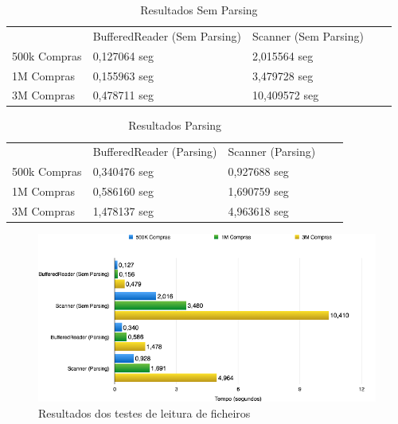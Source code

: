 \documentclass[10pt] {article}
\begin{document}
\begin{table}[h]
\centering
\caption{Resultados Sem Parsing}
\label{my-label}
\begin{tabular}{l|l|l|ll}
\cline{2-3}
                                   & BufferedReader (Sem Parsing) & Scanner (Sem Parsing) &  &  \\ \cline{1-3}
\multicolumn{1}{|l|}{500k Compras} & 0,127064 seg                 & 2,015564 seg          &  &  \\ \cline{1-3}
\multicolumn{1}{|l|}{1M Compras}   & 0,155963 seg                 & 3,479728 seg          &  &  \\ \cline{1-3}
\multicolumn{1}{|l|}{3M Compras}   & 0,478711 seg                 & 10,409572 seg         &  &  \\ \cline{1-3}
\end{tabular}
\end{table}

\begin{table}[h]
\centering
\caption{Resultados Parsing}
\label{my-label}
\begin{tabular}{l|l|l|ll}
\cline{2-3}
                                   & BufferedReader (Parsing) & Scanner (Parsing) &  &  \\ \cline{1-3}
\multicolumn{1}{|l|}{500k Compras} & 0,340476 seg             & 0,927688 seg      &  &  \\ \cline{1-3}
\multicolumn{1}{|l|}{1M Compras}   & 0,586160 seg             & 1,690759 seg      &  &  \\ \cline{1-3}
\multicolumn{1}{|l|}{3M Compras}   & 1,478137 seg             & 4,963618 seg      &  &  \\ \cline{1-3}
\end{tabular}
\end{table}

\begin{figure}[ht!]
\centering
\includegraphics[width=150mm]{filegraph.png}
\caption{Resultados dos testes de leitura de ficheiros}
\label{fig:sales}
\end{figure}
\end{document}
